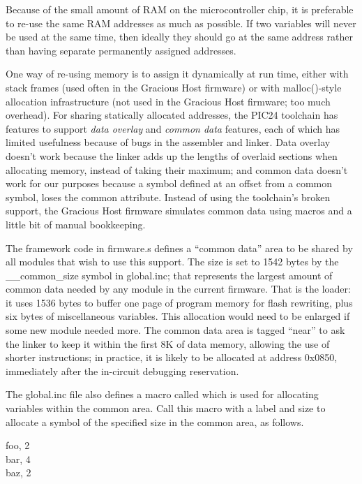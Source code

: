 Because of the small amount of RAM on the microcontroller chip, it is
preferable to re-use the same RAM addresses as much as possible.  If two
variables will never be used at the same time, then ideally they should go
at the same address rather than having separate permanently assigned
addresses.

One way of re-using memory is to assign it dynamically at run time, either
with stack frames (used often in the Gracious Host firmware) or with
malloc()-style allocation infrastructure (not used in the Gracious Host
firmware; too much overhead).  For sharing statically allocated addresses,
the PIC24 toolchain has features to support \emph{data overlay} and
\emph{common data} features, each of which has limited usefulness because of
bugs in the assembler and linker.  Data overlay doesn't work because the
linker adds up the lengths of overlaid sections when allocating memory,
instead of taking their maximum; and common data doesn't work for our
purposes because a symbol defined at an offset from a common symbol, loses
the common attribute.  Instead of using the toolchain's broken support, the
Gracious Host firmware simulates common data using macros and a little bit
of manual bookkeeping.

The framework code in firmware.s defines a ``common data'' area to be shared
by all modules that wish to use this support.  The size is set to 1542 bytes
by the \_\_common\_size symbol in global.inc; that represents the largest
amount of common data needed by any module in the current firmware.  That is
the loader: it uses 1536 bytes to buffer one page of program memory for
flash rewriting, plus six bytes of miscellaneous variables.  This allocation
would need to be enlarged if some new module needed more.  The common data
area is tagged ``near'' to ask the linker to keep it within the first 8K of
data memory, allowing the use of shorter instructions; in practice, it is
likely to be allocated at address 0x0850, immediately after the in-circuit
debugging reservation.

The global.inc file also defines a macro called  which is
used for allocating variables within the common area.  Call this macro with
a label and size to allocate a symbol of the specified size in the common
area, as follows.
\begin{tabbing}
\quad\quad foo, 2\\
\quad\quad bar, 4\\
\quad\quad baz, 2\\
\end{tabbing}

